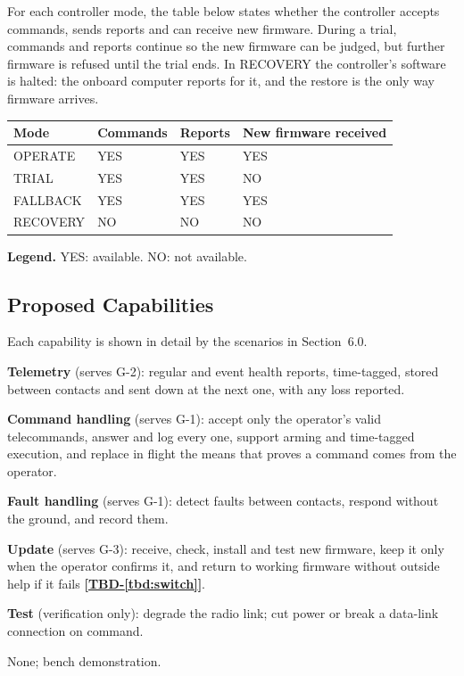 \documentclass[11pt,a4paper]{article}
\newcommand{\tbd}[1]{\mbox{\textbf{[\hyperref[tbd:#1]{TBD-\ref*{tbd:#1}}]}}}
\begin{document}
\medskip
{}
\noindent For each controller mode, the table below states whether the controller
accepts commands, sends reports and can receive new firmware. During a trial,
commands and reports continue so the new firmware can be judged, but further
firmware is refused until the trial ends. In RECOVERY the controller's software
is halted: the onboard computer reports for it, and the restore is the only way
firmware arrives.
\begin{table}[H]
\centering
\begin{tabular}{@{}llll@{}}
\toprule
Mode & Commands & Reports & New firmware received \\
\midrule
OPERATE  & YES & YES & YES \\
TRIAL    & YES & YES & NO \\
FALLBACK & YES & YES & YES \\
RECOVERY & NO  & NO  & NO \\
\bottomrule
\end{tabular}
\end{table}
\noindent\textbf{Legend.} YES: available. NO: not available.

\subsection{Proposed Capabilities}
Each capability is shown in detail by the scenarios in Section~6.0.
\begin{description}[leftmargin=3cm]
\item[Capability-1] \textbf{Telemetry} (serves G-2): regular and event health
  reports, time-tagged, stored between contacts and sent down at the next one,
  with any loss reported.
\item[Capability-2] \textbf{Command handling} (serves G-1): accept only the
  operator's valid telecommands, answer and log every one, support arming and
  time-tagged execution, and replace in flight the means that proves a command
  comes from the operator.
\item[Capability-3] \textbf{Fault handling} (serves G-1): detect faults between
  contacts, respond without the ground, and record them.
\item[Capability-4] \textbf{Update} (serves G-3): receive, check, install and
  test new firmware, keep it only when the operator confirms it, and return to
  working firmware without outside help if it fails \tbd{switch}.
\item[Capability-5] \textbf{Test} (verification only): degrade the radio link;
  cut power or break a data-link connection on command.
\item[Disposal] None; bench demonstration.
\end{description}
\end{document}
